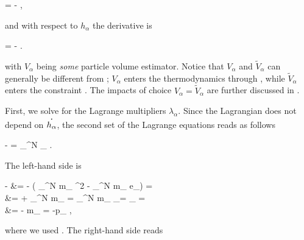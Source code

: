 \documentclass[../main.tex]{subfiles}
\begin{document}
\begin{equations}[single,!,numberline=all]
\label{eq:E-X-DERIVATIVE}
 = -  ,
\end{equations}

and with respect to $h_{\alpha}$ the derivative is

\begin{equations}[single,!,numberline=all]
\label{eq:E-H-DERIVATIVE}
 = -  .
\end{equations}

with $V_{\alpha}$ being \emph{some} particle volume estimator. Notice that $V_{\alpha}$ and $\tilde{V}_{\alpha}$ can generally be different from \autocite{hopkinsGeneralClassLagrangian2013a}; $V_{\alpha}$ enters the thermodynamics through , while $\tilde{V}_{\alpha}$ enters the constraint . The impacts of choice $V_{\alpha} = \tilde{V}_{\alpha}$ are further discussed in \eg \autocite[p.~3]{hopkinsGeneralClassLagrangian2013a}.

First, we solve for the Lagrange multipliers $\lambda_{\alpha}$. Since the Lagrangian  does not depend on $\tdot{h_{\alpha}}$, the second set of the Lagrange equations  reads as follows

\begin{equations}[single,*]
	-  = \sum_{}^N \lambda_{\beta} .
\end{equations}

The left-hand side is

\begin{equations}[columns,*]
	-  &= - \left( \sum_{}^N m_{\beta} ^{2} - \sum_{}^N m_{\beta} e_{\beta}\right) = \\
			      &= + \sum_{}^N m_{\beta}  = \sum_{}^N m_{\beta}  _{= \delta_{\beta \alpha}} = \\
	&= - m_{\alpha}  = -p_{\alpha} ,
\end{equations}

where we used . The right-hand side reads
\end{document}
